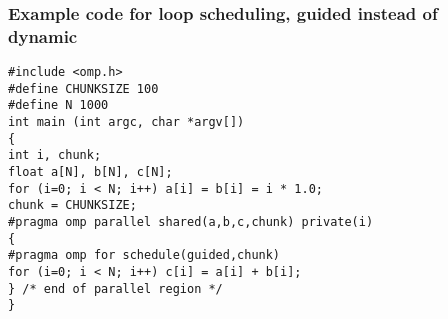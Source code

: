 \documentclass{beamer}
\begin{document}
\begin{frame}
\frametitle{Example code for loop scheduling, guided instead of dynamic}

\begin{block}{}
















\begin{verbatim}
#include <omp.h>
#define CHUNKSIZE 100
#define N 1000
int main (int argc, char *argv[])
{
int i, chunk;
float a[N], b[N], c[N];
for (i=0; i < N; i++) a[i] = b[i] = i * 1.0;
chunk = CHUNKSIZE;
#pragma omp parallel shared(a,b,c,chunk) private(i)
{
#pragma omp for schedule(guided,chunk)
for (i=0; i < N; i++) c[i] = a[i] + b[i];
} /* end of parallel region */
}

\end{verbatim}


\end{block}
\end{frame}
\end{document}
